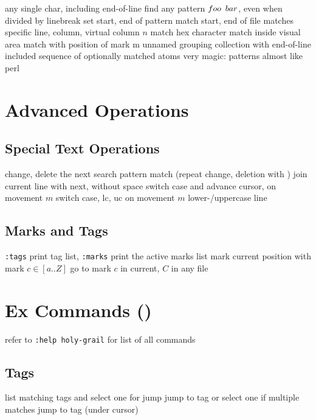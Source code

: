 	{any single char, including end-of-line}
	{find any pattern $foo\enskip bar$, even when divided by linebreak}
	{set start, end of pattern}
\cmdOper{\bs \%\^{} \bs\%\$ }	{match start, end of file}
	{matches specific line, column, virtual column $n$}
	{match hex character}
	{match inside visual area}
	{match with position of mark m}
\cmdOper{\bs\%(\bs) }	{unnamed grouping}
\cmdOper{\bs\_$[$ $]$ }	{collection with end-of-line included}
\cmdOper{\bs\%$[$ $]$ }	{sequence of optionally matched atoms}
	{very magic: patterns almost like perl}

\vfil\break\hfil\vfil\break

\section{Advanced Operations}{}
\subsection{Special Text Operations}{}
	{change, delete the next search pattern match (repeat change, deletion with )}
	{join current line with next, without space}
	{switch case and advance cursor, on movement $m$ }
	{switch case, lc, uc on movement $m$}
	{lower-/uppercase line}

\subsection{Marks and Tags}	{{\tt :tags} print tag list, {\tt :marks} print the active marks list}
	{mark current position with mark $c\in[a..Z]$}
	{go to mark $c$ in current, $C$ in any file}

\section{Ex Commands (\enter)}	{refer to {\tt :help holy-grail} for list of all commands}
\subsection{Tags}	{}
	{list matching tags and select one for jump}
	{jump to tag or select one if multiple matches}
\cmdS{:ta\grey{g} \ctrl[ }	{jump to tag (under cursor)}

